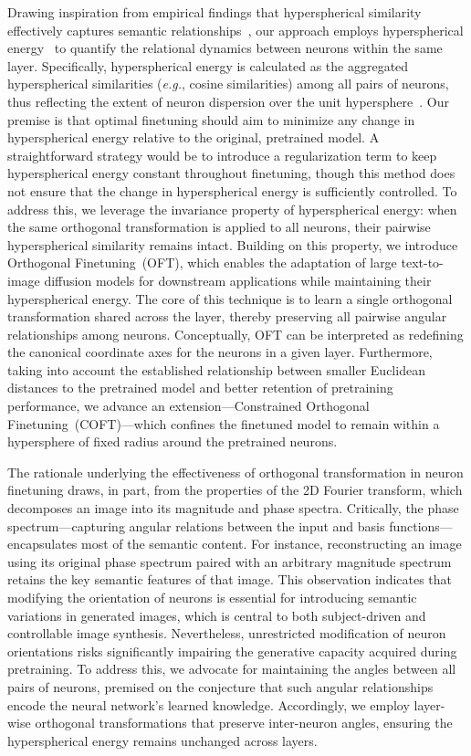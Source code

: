 Drawing inspiration from empirical findings that hyperspherical similarity effectively captures semantic relationships~\cite{liu2017deep,liu2018decoupled,chen2020angular}, our approach employs hyperspherical energy~\cite{liu2018learning} to quantify the relational dynamics between neurons within the same layer. Specifically, hyperspherical energy is calculated as the aggregated hyperspherical similarities (\emph{e.g.}, cosine similarities) among all pairs of neurons, thus reflecting the extent of neuron dispersion over the unit hypersphere~\cite{liu2021learning}. Our premise is that optimal finetuning should aim to minimize any change in hyperspherical energy relative to the original, pretrained model. A straightforward strategy would be to introduce a regularization term to keep hyperspherical energy constant throughout finetuning, though this method does not ensure that the change in hyperspherical energy is sufficiently controlled. To address this, we leverage the invariance property of hyperspherical energy: when the same orthogonal transformation is applied to all neurons, their pairwise hyperspherical similarity remains intact. Building on this property, we introduce Orthogonal Finetuning~(OFT), which enables the adaptation of large text-to-image diffusion models for downstream applications while maintaining their hyperspherical energy. The core of this technique is to learn a single orthogonal transformation shared across the layer, thereby preserving all pairwise angular relationships among neurons. Conceptually, OFT can be interpreted as redefining the canonical coordinate axes for the neurons in a given layer. Furthermore, taking into account the established relationship between smaller Euclidean distances to the pretrained model and better retention of pretraining performance, we advance an extension—Constrained Orthogonal Finetuning~(COFT)—which confines the finetuned model to remain within a hypersphere of fixed radius around the pretrained neurons.

The rationale underlying the effectiveness of orthogonal transformation in neuron finetuning draws, in part, from the properties of the 2D Fourier transform, which decomposes an image into its magnitude and phase spectra. Critically, the phase spectrum—capturing angular relations between the input and basis functions—encapsulates most of the semantic content. For instance, reconstructing an image using its original phase spectrum paired with an arbitrary magnitude spectrum retains the key semantic features of that image. This observation indicates that modifying the orientation of neurons is essential for introducing semantic variations in generated images, which is central to both subject-driven and controllable image synthesis. Nevertheless, unrestricted modification of neuron orientations risks significantly impairing the generative capacity acquired during pretraining. To address this, we advocate for maintaining the angles between all pairs of neurons, premised on the conjecture that such angular relationships encode the neural network's learned knowledge. Accordingly, we employ layer-wise orthogonal transformations that preserve inter-neuron angles, ensuring the hyperspherical energy remains unchanged across layers.

